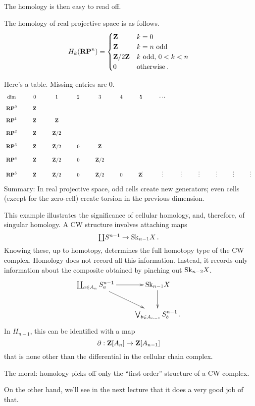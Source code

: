 The homology is then easy to read off.
\begin{prop}
The homology of real projective space is as follows.
\begin{equation*}
 H_k(\mathbf{RP}^n)=\begin{cases}
\mathbf Z & k=0\\
\mathbf Z & k=n\text{ odd}\\
\mathbf Z/2\mathbf Z & k\text{ odd, }0<k<n\\
0 & \text{otherwise}\,.
\end{cases}
\end{equation*}
\end{prop}
Here's a table. Missing entries are $0$.
\[
\xymatrix@R=8pt{
\text{dim} & 0 & 1 & 2 & 3 & 4 & 5 & \cdots \\
\RP^0 & \ZZ \\
\RP^1 & \ZZ & \ZZ \\
\RP^2 & \ZZ & \ZZ/2 \\
\RP^3 & \ZZ & \ZZ/2 & 0 & \ZZ \\
\RP^4 & \ZZ & \ZZ/2 & 0 & \ZZ/2 \\
\RP^5 & \ZZ & \ZZ/2 & 0 & \ZZ/2 & 0 & \ZZ 
\vdots & \vdots & \vdots & \vdots & \vdots & \vdots & \vdots
}\]
Summary: In real projective space, 
odd cells create new generators; even cells (except for the zero-cell) create
torsion in the previous dimension. 

This example illustrates the significance of cellular homology, and, therefore,
of singular homology. A CW structure involves attaching maps 
\[
\textstyle{\coprod}S^{n-1}\to\mathrm{Sk}_{n-1} X\,.
\]
Knowing these, up to homotopy, determines the full homotopy type of the CW 
complex. Homology does not record all this information. Instead, it records 
only information about the composite obtained by pinching out $\mathrm{Sk}_{n-2}X$.
\[
\xymatrix{ 
\coprod_{a\in A_n} S^{n-1}_a \ar[r] \ar[dr] & \Sk_{n-1} X \ar[d] \\
& \bigvee_{b\in A_{n-1}} S^{n-1}_b\,.
}\]
In $H_{n-1}$, this can be identified with a map
\[
\partial:\mathbf Z[A_n]\to\mathbf Z[A_{n-1}]
\]
that is none other than the differential in the cellular chain complex.

The moral: homology picks off only the ``first order'' structure of a CW 
complex. 

On the other hand, we'll see in the next lecture that it does a very good job
of that. 


